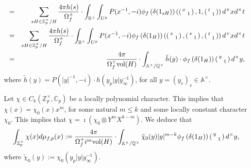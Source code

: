 \documentclass{amsart}
\newcommand{\Z}{{\mathbb Z}}
\newcommand{\A}{{\mathbb A}}
\newcommand{\Q}{{\mathbb Q}}
\newcommand{\C}{{\mathbb C}}
\newcommand{\R}{{\mathbb R}}
\begin{document}
\begin{eqnarray*}
&=&\sum_{sH\in\Z_p^\times/H}\frac{4\pi h(s)}{\Omega_f^+}\cdot\int_{\R^+}\int_{U^p}P(x^{-1},-i)\phi_f\left(\delta(1_{sH})\right)\left(\left(\begin{smallmatrix}x&\\&1\end{smallmatrix}\right),1,\left(\begin{smallmatrix}t&\\&1\end{smallmatrix}\right)\right)d^{\times}xd^\times t\\
&=&\sum_{sH\in\Z_p^\times/H}\frac{4\pi h(s)}{\Omega_f^+}\cdot\int_{\R^+}\int_{U^p}P(x^{-1},-i)\phi_f\left(\delta(1_{H})\right)\left(\left(\begin{smallmatrix}x&\\&1\end{smallmatrix}\right),\left(\begin{smallmatrix}s&\\&1\end{smallmatrix}\right),\left(\begin{smallmatrix}t&\\&1\end{smallmatrix}\right)\right)d^{\times}xd^\times t\\
&=&\frac{4\pi}{\Omega_f^+{\rm vol}(H)}\cdot\int_{\A^\times/\Q^\times}\tilde h(y)\cdot\phi_f\left(\delta(1_{H})\right)\left(\begin{smallmatrix}y&\\&1\end{smallmatrix}\right)d^{\times}y,
\end{eqnarray*}
where $\tilde h(y)=P(|y|^{-1},-i)\cdot h(y_p|y|y_\infty^{-1})$, for all $y=(y_v)_v\in\A^\times$.



Let $\chi\in C_k(\Z_p^\times,\C_p)$ be a locally polynomial character. This implies that $\chi(x)=\chi_0(x)x^m$, for some natural $m\leq k$ and some locally constant character $\chi_0$. This implies that $\chi=\imath(\chi_0\otimes Y^{m}X^{k-m})$. We deduce that
\[
\int_{\Z_p^\times}\chi(x)d\mu_{f,p}(x):=\frac{4\pi }{\Omega_f^+i^m{\rm vol}(H)}\cdot\int_{\A^\times/\Q^\times}\tilde\chi_0(y)|y|^{m-k}\phi_f\left(\delta(1_H)\right)\left(\begin{smallmatrix}y&\\&1\end{smallmatrix}\right)d^{\times}y,
\]
where $\tilde\chi_0(y):=\chi_0(y_p|y|y_\infty^{-1})$.
\end{document}
